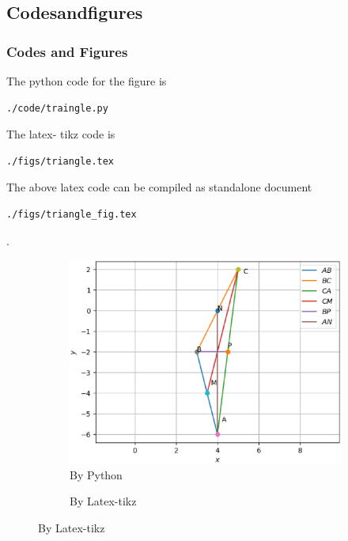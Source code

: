 \documentclass{beamer}
\begin{document}
\subsection*{Codesandfigures}
\begin{frame}[fragile]
\frametitle{Codes and Figures}
\tiny
\begin{flushleft}
The python code for the figure is
\begin{lstlisting}
./code/traingle.py
\end{lstlisting}
The latex- tikz code is
\begin{lstlisting}
./figs/triangle.tex
\end{lstlisting}
The above latex code can be compiled as standalone document
\begin{lstlisting} 
./figs/triangle_fig.tex
\end{lstlisting}
\end{flushleft}.
\begin{figure}
\begin{flushleft}
\begin{subfigure}{0.2\textwidth}
\includegraphics[scale=0.275]{./figs/triangle.eps}
\caption{\tiny By Python}
\end{subfigure}
%
\begin{subfigure}{0.65\textwidth}
\begin{flushright}

\caption{\tiny By Latex-tikz}
\end{flushright}
\end{subfigure}
\end{flushleft}
%
\end{figure}
\end{frame}
\end{document}
